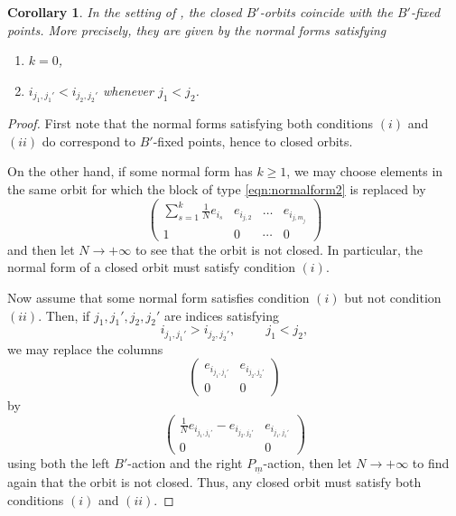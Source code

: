 \documentclass[pdftex]{sigma}
\numberwithin{equation}{section}
\theoremstyle{definition}
\theoremstyle{plain}
\theoremstyle{plain}
\theoremstyle{plain}
\theoremstyle{plain}
\newtheorem{corollaryx}[theoremx]{Corollary}
\begin{document}
\begin{corollaryx}{\label{orbites fermées multiplicity free}}
	In the setting of , the closed $B'$-orbits coincide with the $B'$-fixed points. More precisely, they are given by the normal forms satisfying 
	\begin{enumerate}[leftmargin=*, label = $(\roman*)$]
		\item $k = 0$,
		\item $i_{j_1,j_1'} < i_{j_2,j_2'}$ whenever $j_1 < j_2$.
	\end{enumerate}
\end{corollaryx}
\begin{proof}
	First note that the normal forms satisfying both conditions $(i)$ and $(ii)$ do correspond to $B'$-fixed points, hence to closed orbits.
	
	On the other hand, if some normal form has $k \geqslant 1$, we may choose elements in the same orbit for which the block of type \eqref{eqn:normalform2} is replaced by
	\begin{equation*}
		\begin{pmatrix}
			\displaystyle \sum_{s=1}^k \frac{1}{N}e_{i_s} & e_{i_{j,2}} & \dots & e_{i_{j,m_j}} \\
			1 & 0 & \cdots & 0
		\end{pmatrix}
	\end{equation*}
	and then let $N \to +\infty$ to see that the orbit is not closed. In particular, the normal form of a closed orbit must satisfy condition $(i)$.
	
	Now assume that some normal form satisfies condition $(i)$ but not condition $(ii)$. Then, if $j_1,j_1',j_2,j_2'$ are indices satisfying
	\begin{equation*}
		i_{j_1,j_1'} > i_{j_2,j_2'}, \hspace{1cm} j_1 < j_2,
	\end{equation*}
	we may replace the columns
	\begin{equation*}
		\begin{pmatrix}
		e_{i_{j_1,j_1'}} & e_{i_{j_2,j_2'}} \\
		0 & 0
	\end{pmatrix}
	\end{equation*}
	by
	\begin{equation*}
		\begin{pmatrix}
		\frac{1}{N}e_{i_{j_1,j_1'}} - e_{i_{j_2,j_2'}} & e_{i_{j_1,j_1'}} \\
		0 & 0
	\end{pmatrix}
	\end{equation*}
	using both the left $B'$-action and the right $P_{\underline m}$-action, then let $N \to +\infty$ to find again that the orbit is not closed. Thus, any closed orbit must satisfy both conditions $(i)$ and $(ii)$.
\end{proof}
\end{document}
